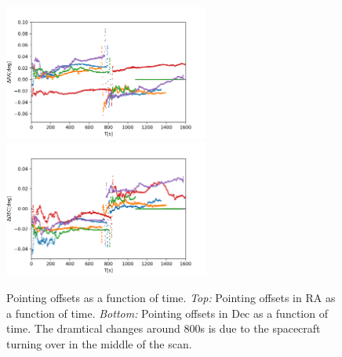 \documentclass[12pt, preprint]{aastex}
\begin{document}
\begin{figure}[p]
\begin{center}
\includegraphics[width=0.6\textwidth]{figures/all-ra}
\includegraphics[width=0.6\textwidth]{figures/all-dec}
\end{center}
\caption{%
  \label{pointing}
  Pointing offsets as a function of time.
  \emph{Top:}  Pointing offsets in RA as a function of time.
  \emph{Bottom:} Pointing offsets in Dec as a function of time.
  The dramtical changes around 800s is due to the spacecraft turning over in the middle of the scan. 
  }
\end{figure}
\end{document}
